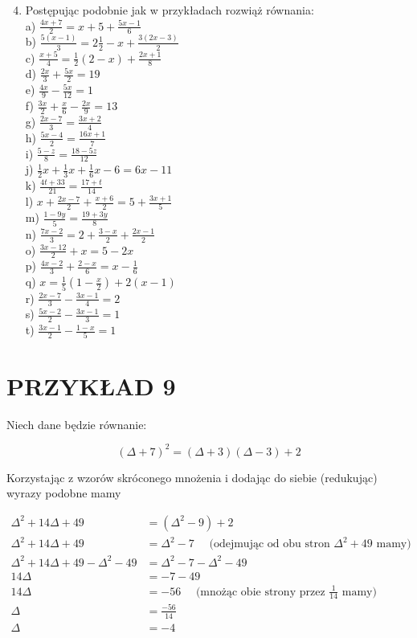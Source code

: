 \documentclass[10pt]{article}
\begin{document}
\begin{enumerate}
  \setcounter{enumi}{3}
  \item Postępując podobnie jak w przykładach rozwiąż równania:\\
a) \(\frac{4 x+7}{2}=x+5+\frac{5 x-1}{6}\)\\
b) \(\frac{5(x-1)}{3}=2 \frac{1}{2}-x+\frac{3(2 x-3)}{2}\)\\
c) \(\frac{x+5}{4}=\frac{1}{2}(2-x)+\frac{2 x+1}{8}\)\\
d) \(\frac{2 x}{3}+\frac{5 x}{2}=19\)\\
e) \(\frac{4 x}{9}-\frac{5 x}{12}=1\)\\
f) \(\frac{3 x}{2}+\frac{x}{6}-\frac{2 x}{9}=13\)\\
g) \(\frac{2 x-7}{3}=\frac{3 x+2}{4}\)\\
h) \(\frac{5 x-4}{2}=\frac{16 x+1}{7}\)\\
i) \(\frac{5-z}{8}=\frac{18-5 z}{12}\)\\
j) \(\frac{1}{2} x+\frac{1}{3} x+\frac{1}{6} x-6=6 x-11\)\\
k) \(\frac{4 t+33}{21}=\frac{17+t}{14}\)\\
l) \(x+\frac{2 x-7}{2}+\frac{x+6}{2}=5+\frac{3 x+1}{5}\)\\
m) \(\frac{1-9 y}{5}=\frac{19+3 y}{8}\)\\
n) \(\frac{7 x-2}{3}=2+\frac{3-x}{2}+\frac{2 x-1}{2}\)\\
o) \(\frac{3 x-12}{2}+x=5-2 x\)\\
p) \(\frac{4 x-2}{3}+\frac{2-x}{6}=x-\frac{1}{6}\)\\
q) \(x=\frac{1}{5}\left(1-\frac{x}{2}\right)+2(x-1)\)\\
r) \(\frac{2 x-7}{3}-\frac{3 x-1}{4}=2\)\\
s) \(\frac{5 x-2}{2}-\frac{3 x-1}{3}=1\)\\
t) \(\frac{3 x-1}{2}-\frac{1-x}{5}=1\)
\end{enumerate}

\section*{PRZYKŁAD 9}
Niech dane będzie równanie:

\[
(\Delta+7)^{2}=(\Delta+3)(\Delta-3)+2
\]

Korzystając z wzorów skróconego mnożenia i dodając do siebie (redukując) wyrazy podobne mamy

\[
\begin{aligned}
\Delta^{2}+14 \Delta+49 & =\left(\Delta^{2}-9\right)+2 \\
\Delta^{2}+14 \Delta+49 & =\Delta^{2}-7 \quad \text { (odejmując od obu stron } \Delta^{2}+49 \text { mamy) } \\
\Delta^{2}+14 \Delta+49-\Delta^{2}-49 & =\Delta^{2}-7-\Delta^{2}-49 \\
14 \Delta & =-7-49 \\
14 \Delta & =-56 \quad \text { (mnożąc obie strony przez } \frac{1}{14} \text { mamy) } \\
\Delta & =\frac{-56}{14} \\
\Delta & =-4
\end{aligned}
\]
\end{document}
